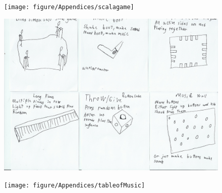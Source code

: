 \begin{figure}[H]
	\centering
	\texttt{[image: figure/Appendices/scalagame]}
	\label{fig:sketchOne}
	\caption{}
	
\end{figure}

\begin{figure}[H]
	\centering
	\includegraphics[width=0.7\linewidth]{figure/Appendices/sets}
	\label{fig:sets}
	\caption{}
	
\end{figure}

\begin{figure}[H]
	\centering
	\texttt{[image: figure/Appendices/tableofMusic]}
	\label{fig:tableofMusic}
	\caption{}
	
\end{figure}
